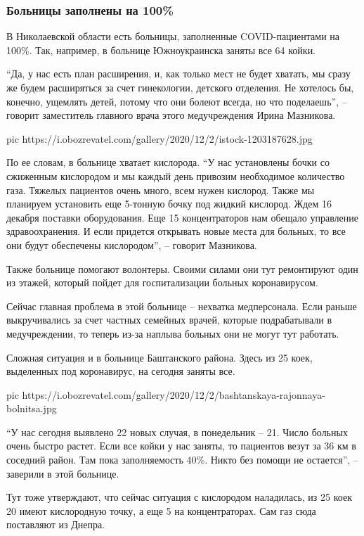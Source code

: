 \subsubsection{Больницы заполнены на 100\%}

В Николаевской области есть больницы, заполненные COVID-пациентами на 100\%.
Так, например, в больнице Южноукраинска заняты все 64 койки.

\enquote{Да, у нас есть план расширения, и, как только мест не будет хватать, мы сразу
же будем расширяться за счет гинекологии, детского отделения. Не хотелось бы,
конечно, ущемлять детей, потому что они болеют всегда, но что поделаешь}, –
говорит заместитель главного врача этого медучреждения Ирина Мазникова.

\ifcmt
pic https://i.obozrevatel.com/gallery/2020/12/2/istock-1203187628.jpg
\fi

По ее словам, в больнице хватает кислорода. \enquote{У нас установлены бочки со
сжиженным кислородом и мы каждый день привозим необходимое количество газа.
Тяжелых пациентов очень много, всем нужен кислород. Также мы планируем
установить еще 5-тонную бочку под жидкий кислород. Ждем 16 декабря поставки
оборудования. Еще 15 концентраторов нам обещало управление здравоохранения. И
если придется открывать новые места для больных, то все они будут обеспечены
кислородом}, – говорит Мазникова.

Также больнице помогают волонтеры. Своими силами они тут ремонтируют один из
этажей, который пойдет для госпитализации больных коронавирусом.

Сейчас главная проблема в этой больнице – нехватка медперсонала. Если раньше
выкручивались за счет частных семейных врачей, которые подрабатывали в
медучреждении, то теперь из-за наплыва больных они не могут тут работать.

Сложная ситуация и в больнице Баштанского района. Здесь из 25 коек, выделенных
под коронавирус, на сегодня заняты все.

\ifcmt
pic https://i.obozrevatel.com/gallery/2020/12/2/bashtanskaya-rajonnaya-bolnitsa.jpg
\fi

\enquote{У нас сегодня выявлено 22 новых случая, в понедельник – 21. Число больных
очень быстро растет. Если все койки у нас заняты, то пациентов везут за 36 км в
соседний район. Там пока заполняемость 40\%. Никто без помощи не остается}, –
заверили в этой больнице.

Тут тоже утверждают, что сейчас ситуация с кислородом наладилась, из 25 коек 20
имеют кислородную точку, а еще 5 на концентраторах. Сам газ сюда поставляют из
Днепра.

